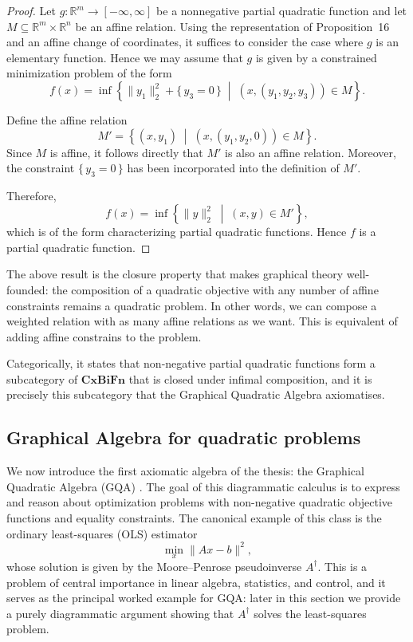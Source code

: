 \begin{proof}
Let $g:\mathbb{R}^m \to [-\infty,\infty]$ be a nonnegative partial quadratic
function and let $M \subseteq \mathbb{R}^m \times \mathbb{R}^n$ be an affine
relation. Using the representation of Proposition~16 and an affine change of
coordinates, it suffices to consider the case where $g$ is an elementary
function. Hence we may assume that $g$ is given by a constrained minimization
problem of the form
\[
f(x)
=
\inf \left\{
\|y_1\|_2^2 + \{\, y_3 = 0 \,\}
\;\middle|\;
(x,(y_1,y_2,y_3)) \in M
\right\}.
\]

Define the affine relation
\[
M'
=
\left\{
(x,y_1)
\;\middle|\;
(x,(y_1,y_2,0)) \in M
\right\}.
\]
Since $M$ is affine, it follows directly that $M'$ is also an affine
relation. Moreover, the constraint $\{\, y_3 = 0 \,\}$ has been incorporated
into the definition of $M'$.

Therefore,
\[
f(x)
=
\inf
\left\{
\|y\|_2^2
\;\middle|\;
(x,y) \in M'
\right\},
\]
which is of the form characterizing partial quadratic functions. Hence
$f$ is a partial quadratic function.

\end{proof}
The above result is the closure property that makes graphical theory well-founded: the composition of a quadratic objective with any number of  affine constraints remains a quadratic problem. In other words, we can compose a weighted relation with as many affine relations as we want. This is equivalent of adding affine constrains to the problem.

Categorically, it states  that non-negative partial quadratic functions form a subcategory of  $\mathbf{CxBiFn}$ that is closed under infimal composition, and it is  precisely this subcategory that the Graphical Quadratic Algebra axiomatises.

\subsection{Graphical Algebra for quadratic problems}\label{sec:gqa}

We now introduce the first axiomatic algebra of the thesis: the Graphical  Quadratic Algebra (GQA) \cite{stein2024gqa}. The goal of this diagrammatic  calculus is to express and reason about optimization problems with non-negative  quadratic objective functions and equality constraints. The canonical example  of this class is the ordinary least-squares (OLS) estimator
\[
\min_x \| Ax - b \|^2,
\]
whose solution is given by the Moore--Penrose pseudoinverse $A^\dagger$.  This is a problem of central importance in linear algebra, statistics, and  control, and it serves as the principal worked example for GQA: later in  this section we provide a purely diagrammatic argument showing that  $A^\dagger$ solves the least-squares problem.

